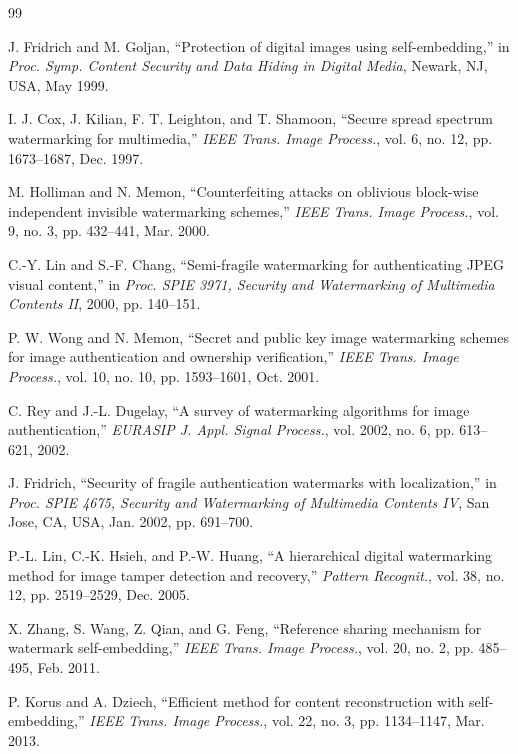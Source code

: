 \documentclass[12pt,a4paper]{article}
\begin{document}
\begin{thebibliography}{99}
\small

 J. Fridrich and M. Goljan, ``Protection of digital images using self-embedding,'' in \emph{Proc. Symp. Content Security and Data Hiding in Digital Media}, Newark, NJ, USA, May 1999.

 I. J. Cox, J. Kilian, F. T. Leighton, and T. Shamoon, ``Secure spread spectrum watermarking for multimedia,'' \emph{IEEE Trans. Image Process.}, vol. 6, no. 12, pp. 1673--1687, Dec. 1997.

 M. Holliman and N. Memon, ``Counterfeiting attacks on oblivious block-wise independent invisible watermarking schemes,'' \emph{IEEE Trans. Image Process.}, vol. 9, no. 3, pp. 432--441, Mar. 2000.

 C.-Y. Lin and S.-F. Chang, ``Semi-fragile watermarking for authenticating JPEG visual content,'' in \emph{Proc. SPIE 3971, Security and Watermarking of Multimedia Contents II}, 2000, pp. 140--151.

 P. W. Wong and N. Memon, ``Secret and public key image watermarking schemes for image authentication and ownership verification,'' \emph{IEEE Trans. Image Process.}, vol. 10, no. 10, pp. 1593--1601, Oct. 2001.

 C. Rey and J.-L. Dugelay, ``A survey of watermarking algorithms for image authentication,'' \emph{EURASIP J. Appl. Signal Process.}, vol. 2002, no. 6, pp. 613--621, 2002.

 J. Fridrich, ``Security of fragile authentication watermarks with localization,'' in \emph{Proc. SPIE 4675, Security and Watermarking of Multimedia Contents IV}, San Jose, CA, USA, Jan. 2002, pp. 691--700.

 P.-L. Lin, C.-K. Hsieh, and P.-W. Huang, ``A hierarchical digital watermarking method for image tamper detection and recovery,'' \emph{Pattern Recognit.}, vol. 38, no. 12, pp. 2519--2529, Dec. 2005.

 X. Zhang, S. Wang, Z. Qian, and G. Feng, ``Reference sharing mechanism for watermark self-embedding,'' \emph{IEEE Trans. Image Process.}, vol. 20, no. 2, pp. 485--495, Feb. 2011.

 P. Korus and A. Dziech, ``Efficient method for content reconstruction with self-embedding,'' \emph{IEEE Trans. Image Process.}, vol. 22, no. 3, pp. 1134--1147, Mar. 2013.


\end{thebibliography}
\end{document}
